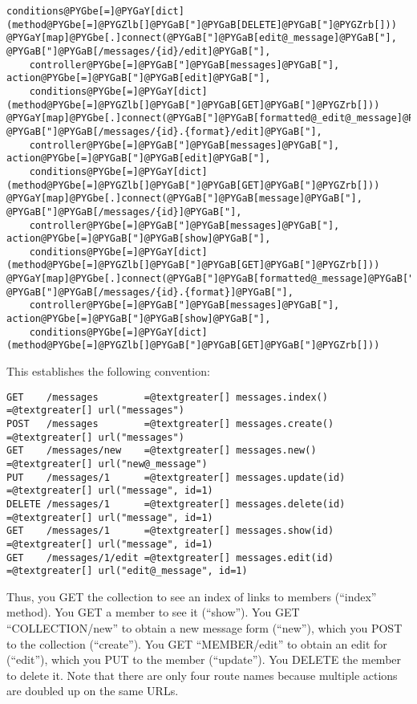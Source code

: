 \documentclass[letterpaper,10pt,english]{manual}
\begin{document}
\begin{Verbatim}[commandchars=@\[\]]
    conditions@PYGbe[=]@PYGaY[dict](method@PYGbe[=]@PYGZlb[]@PYGaB["]@PYGaB[DELETE]@PYGaB["]@PYGZrb[]))
@PYGaY[map]@PYGbe[.]connect(@PYGaB["]@PYGaB[edit@_message]@PYGaB["], @PYGaB["]@PYGaB[/messages/{id}/edit]@PYGaB["],
    controller@PYGbe[=]@PYGaB["]@PYGaB[messages]@PYGaB["], action@PYGbe[=]@PYGaB["]@PYGaB[edit]@PYGaB["],
    conditions@PYGbe[=]@PYGaY[dict](method@PYGbe[=]@PYGZlb[]@PYGaB["]@PYGaB[GET]@PYGaB["]@PYGZrb[]))
@PYGaY[map]@PYGbe[.]connect(@PYGaB["]@PYGaB[formatted@_edit@_message]@PYGaB["], @PYGaB["]@PYGaB[/messages/{id}.{format}/edit]@PYGaB["],
    controller@PYGbe[=]@PYGaB["]@PYGaB[messages]@PYGaB["], action@PYGbe[=]@PYGaB["]@PYGaB[edit]@PYGaB["],
    conditions@PYGbe[=]@PYGaY[dict](method@PYGbe[=]@PYGZlb[]@PYGaB["]@PYGaB[GET]@PYGaB["]@PYGZrb[]))
@PYGaY[map]@PYGbe[.]connect(@PYGaB["]@PYGaB[message]@PYGaB["], @PYGaB["]@PYGaB[/messages/{id}]@PYGaB["],
    controller@PYGbe[=]@PYGaB["]@PYGaB[messages]@PYGaB["], action@PYGbe[=]@PYGaB["]@PYGaB[show]@PYGaB["],
    conditions@PYGbe[=]@PYGaY[dict](method@PYGbe[=]@PYGZlb[]@PYGaB["]@PYGaB[GET]@PYGaB["]@PYGZrb[]))
@PYGaY[map]@PYGbe[.]connect(@PYGaB["]@PYGaB[formatted@_message]@PYGaB["], @PYGaB["]@PYGaB[/messages/{id}.{format}]@PYGaB["],
    controller@PYGbe[=]@PYGaB["]@PYGaB[messages]@PYGaB["], action@PYGbe[=]@PYGaB["]@PYGaB[show]@PYGaB["],
    conditions@PYGbe[=]@PYGaY[dict](method@PYGbe[=]@PYGZlb[]@PYGaB["]@PYGaB[GET]@PYGaB["]@PYGZrb[]))
\end{Verbatim}

This establishes the following convention:

\begin{Verbatim}[commandchars=@\[\]]
GET    /messages        =@textgreater[] messages.index()    =@textgreater[] url("messages")
POST   /messages        =@textgreater[] messages.create()   =@textgreater[] url("messages")
GET    /messages/new    =@textgreater[] messages.new()      =@textgreater[] url("new@_message")
PUT    /messages/1      =@textgreater[] messages.update(id) =@textgreater[] url("message", id=1)
DELETE /messages/1      =@textgreater[] messages.delete(id) =@textgreater[] url("message", id=1)
GET    /messages/1      =@textgreater[] messages.show(id)   =@textgreater[] url("message", id=1)
GET    /messages/1/edit =@textgreater[] messages.edit(id)   =@textgreater[] url("edit@_message", id=1)
\end{Verbatim}

Thus, you GET the collection to see an index of links to members (``index''
method).  You GET a member to see it (``show'').  You GET ``COLLECTION/new'' to
obtain a new message form (``new''), which you POST to the collection (``create'').
You GET ``MEMBER/edit'' to obtain an edit for (``edit''), which you PUT to the
member (``update'').  You DELETE the member to delete it.  Note that there are
only four route names because multiple actions are doubled up on the same URLs.
\end{document}
